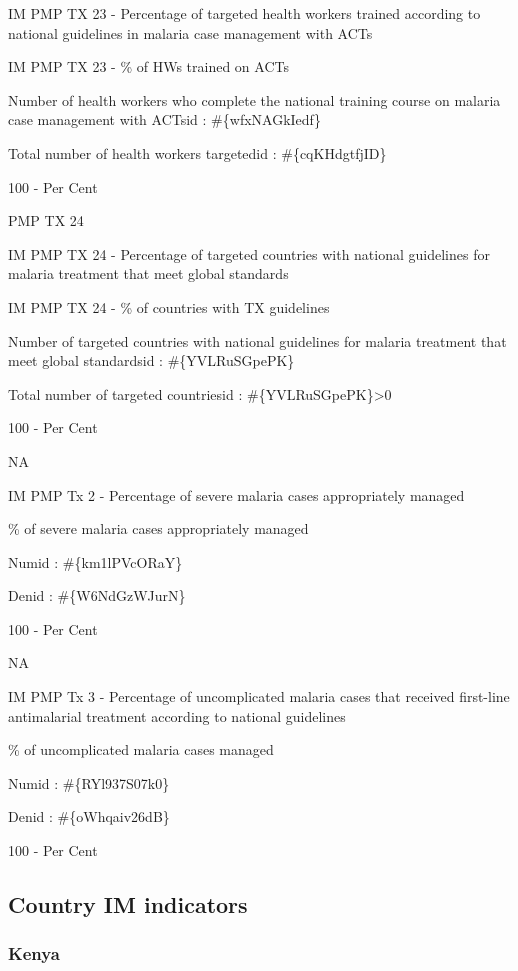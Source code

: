 \documentclass[]{book}
\begin{document}
IM PMP TX 23 - Percentage of targeted health workers trained according to national guidelines in malaria case management with ACTs

IM PMP TX 23 - \% of HWs trained on ACTs

Number of health workers who complete the national training course on malaria case management with ACTsid : \#\{wfxNAGkIedf\}

Total number of health workers targetedid : \#\{cqKHdgtfjID\}

100 - Per Cent

PMP TX 24

IM PMP TX 24 - Percentage of targeted countries with national guidelines for malaria treatment that meet global standards

IM PMP TX 24 - \% of countries with TX guidelines

Number of targeted countries with national guidelines for malaria treatment that meet global standardsid : \#\{YVLRuSGpePK\}

Total number of targeted countriesid : \#\{YVLRuSGpePK\}\textgreater{}0

100 - Per Cent

NA

IM PMP Tx 2 - Percentage of severe malaria cases appropriately managed

\% of severe malaria cases appropriately managed

Numid : \#\{km1lPVcORaY\}

Denid : \#\{W6NdGzWJurN\}

100 - Per Cent

NA

IM PMP Tx 3 - Percentage of uncomplicated malaria cases that received first-line antimalarial treatment according to national guidelines

\% of uncomplicated malaria cases managed

Numid : \#\{RYl937S07k0\}

Denid : \#\{oWhqaiv26dB\}

100 - Per Cent

\hypertarget{country-ind}{%
\subsection{Country IM indicators}\label{country-ind}}

\hypertarget{kenya}{%
\subsubsection{Kenya}\label{kenya}}
\end{document}
